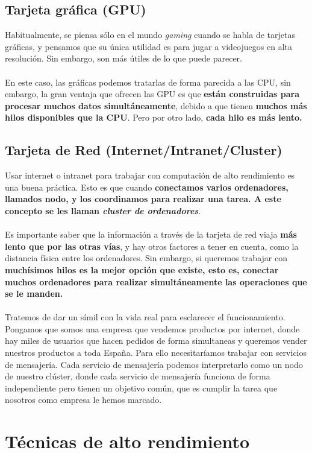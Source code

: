 \subsection{Tarjeta gráfica (GPU)}
Habitualmente, se piensa sólo en el mundo \textit{gaming} cuando se habla de tarjetas gráficas, y pensamos que su única utilidad es para jugar a videojuegos en alta resolución. Sin embargo, son más útiles de lo que puede parecer. \\ \\
En este caso, las gráficas podemos tratarlas de forma parecida a las CPU, sin embargo, la gran ventaja que ofrecen las GPU es que \textbf{están construidas para procesar muchos datos simultáneamente}, debido a que tienen \textbf{muchos más hilos disponibles que la CPU}. Pero por otro lado, \textbf{cada hilo es más lento.}

\subsection{Tarjeta de Red (Internet/Intranet/Cluster)}
Usar internet o intranet para trabajar con computación de alto rendimiento es una buena práctica. Esto es que cuando \textbf{conectamos varios ordenadores, llamados nodo, y los coordinamos para realizar una tarea. A este concepto se les llaman \textit{cluster de ordenadores}}. \\ \\
Es importante saber que la información a través de la tarjeta de red viaja \textbf{más lento que por las otras vías}, y hay otros factores a tener en cuenta, como la distancia física entre los ordenadores. Sin embargo, si queremos trabajar con \textbf{muchísimos hilos es la mejor opción que existe, esto es, conectar muchos ordenadores para realizar simultáneamente las operaciones que se le manden.}\\ \\
Tratemos de dar un símil con la vida real para esclarecer el funcionamiento. Pongamos que somos una empresa que vendemos productos por internet, donde hay miles de usuarios que hacen pedidos de forma simultaneas y queremos vender nuestros productos a toda España. Para ello necesitaríamos trabajar con servicios de mensajería. Cada servicio de mensajería podemos interpretarlo como un nodo de nuestro clúster, donde cada servicio de mensajería funciona de forma independiente pero tienen un objetivo común, que es cumplir la tarea que nosotros como empresa le hemos marcado.
\section{Técnicas de alto rendimiento}

